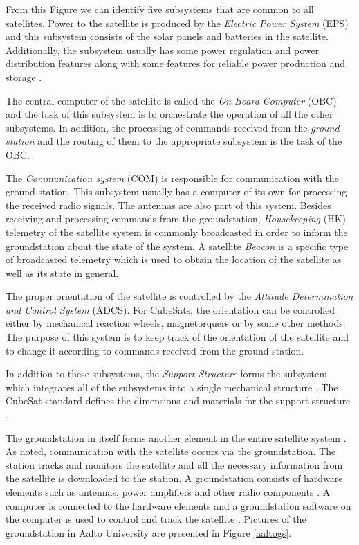 \documentclass[english,12pt,a4paper,pdftex,elec,utf8]{aaltothesis}
\begin{document}
From this Figure we can identify five subsystems that are common to all satellites. Power to the satellite is produced by the \textit{Electric Power System} (EPS) and this subsystem consists of the solar panels and batteries in the satellite. Additionally, the subsystem usually has some power regulation and power distribution features along with some features for reliable power production and storage \cite{spacesystemsengineering}.\par 
The central computer of the satellite is called the \textit{On-Board Computer} (OBC) and the task of this subsystem is to orchestrate the operation of all the other subsystems. In addition, the processing of commands received from the \textit{ground station} and the routing of them to the appropriate subsystem is the task of the OBC. \cite{spacesystemsengineering} \par 
The \textit{Communication system} (COM) is responsible for communication with the ground station. This subsystem usually has a computer of its own for processing the received radio signals. The antennas are also part of this system. Besides receiving and processing commands from the groundstation, \textit{Housekeeping} (HK) telemetry of the satellite system is commonly broadcasted in order to inform the groundstation about the state of the system. A satellite \textit{Beacon} is a specific type of broadcasted telemetry which is used to obtain the location of the satellite as well as its state in general.   \cite{spacesystemsengineering} \par
The proper orientation of the satellite is controlled by the \textit{Attitude Determination and Control System} (ADCS). For CubeSats, the orientation can be controlled either by mechanical reaction wheels, magnetorquers or by some other methods. The purpose of this system is to keep track of the orientation of the satellite and to change it according to commands received from the ground station. \cite{spacesystemsengineering}\par 
In addition to these subsystems, the \textit{Support Structure} forms the subsystem which integrates all of the subsystems into a single mechanical structure \cite{spacesystemsengineering}. The CubeSat standard defines the dimensions and materials for the support structure \cite{cds}. \par 
The groundstation in itself forms another element in the entire satellite system \cite{spacesystemsengineering}. As noted, communication with the satellite occurs via the groundstation. The station tracks and monitors the satellite and all the necessary information from the satellite is downloaded to the station. A groundstation consists of hardware elements such as antennas, power amplifiers and other radio components \cite{radiohandbook}. A computer is connected to the hardware elements and a groundstation software on the computer is used to control and track the satellite \cite{spacesystemsengineering, radiohandbook}. Pictures of the groundstation in Aalto University are presented in Figure \ref{aaltogs}.
\end{document}
